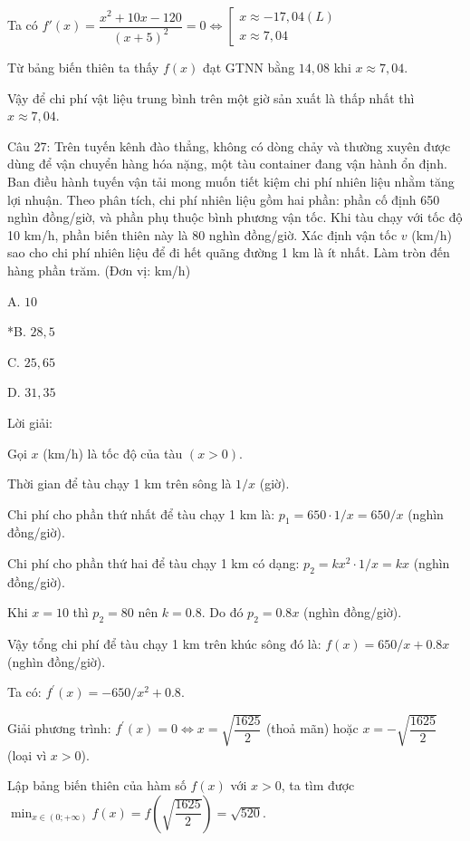 \documentclass[a4paper,12pt]{article}
\begin{document}
Ta có \(f'(x)=\dfrac{x^2+10x-120}{(x+5)^2}=0 \Leftrightarrow \left[\begin{array}{l}x \approx -17,04(L) \\ x \approx 7,04\end{array}\right.\)

Từ bảng biến thiên ta thấy \(f(x)\) đạt GTNN bằng \(14,08\) khi \(x \approx 7,04\).

Vậy để chi phí vật liệu trung bình trên một giờ sản xuất là thấp nhất thì \(x \approx 7,04\).




Câu 27: Trên tuyến kênh đào thẳng, không có dòng chảy và thường xuyên được dùng để vận chuyển hàng hóa nặng, một tàu container đang vận hành ổn định. Ban điều hành tuyến vận tải mong muốn tiết kiệm chi phí nhiên liệu nhằm tăng lợi nhuận. Theo phân tích, chi phí nhiên liệu gồm hai phần: phần cố định 650 nghìn đồng/giờ, và phần phụ thuộc bình phương vận tốc. Khi tàu chạy với tốc độ 10 km/h, phần biến thiên này là 80 nghìn đồng/giờ. Xác định vận tốc \(v\) (km/h) sao cho chi phí nhiên liệu để đi hết quãng đường 1 km là ít nhất. Làm tròn đến hàng phần trăm. (Đơn vị: km/h)

A. \(10\)

*B. \(28,5\)

C. \(25,65\)

D. \(31,35\)

Lời giải:


Gọi \(x\) (km/h) là tốc độ của tàu \((x > 0)\).

Thời gian để tàu chạy 1 km trên sông là \(1/x\) (giờ).

Chi phí cho phần thứ nhất để tàu chạy 1 km là: \(p_1=650 \cdot 1/x=650/x\) (nghìn đồng/giờ).

Chi phí cho phần thứ hai để tàu chạy 1 km có dạng: \(p_2=k x^2 \cdot 1/x=k x\) (nghìn đồng/giờ).

Khi \(x=10\) thì \(p_2=80\) nên \(k=0.8\). Do đó \(p_2=0.8 x\) (nghìn đồng/giờ).

Vậy tổng chi phí để tàu chạy 1 km trên khúc sông đó là: \(f(x)=650/x+0.8 x\) (nghìn đồng/giờ).

Ta có: \(f^{\prime}(x)=-650/x^2+0.8\).

        Giải phương trình: \(f^{\prime}(x)=0 \Leftrightarrow x=\sqrt{\dfrac{1625}{2}}\) (thoả mãn) hoặc \(x=-\sqrt{\dfrac{1625}{2}}\) (loại vì \(x>0\)).

        Lập bảng biến thiên của hàm số \(f(x)\) với \(x>0\), ta tìm được \(\min_{x \in(0 ;+\infty)} f(x)=f(\sqrt{\dfrac{1625}{2}})=\sqrt{520}\).
\end{document}
